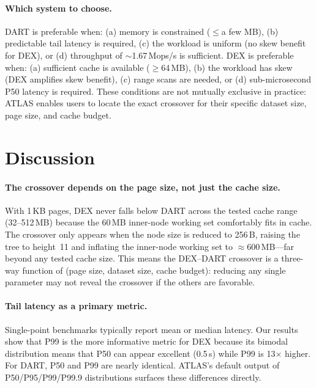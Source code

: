 \documentclass[sigconf, nonacm]{acmart}
\begin{document}
\paragraph{Which system to choose.}
DART is preferable when: (a) memory is constrained (${\le}$a few MB), (b) predictable tail latency is required, (c) the workload is uniform (no skew benefit for DEX), or (d) throughput of ${\sim}$1.67\,Mops/s is sufficient. DEX is preferable when: (a) sufficient cache is available (${\ge}$64\,MB), (b) the workload has skew (DEX amplifies skew benefit), (c) range scans are needed, or (d) sub-microsecond P50 latency is required. These conditions are not mutually exclusive in practice: ATLAS enables users to locate the exact crossover for their specific dataset size, page size, and cache budget.

\section{Discussion}
\label{sec:discussion}

\paragraph{The crossover depends on the page size, not just the cache size.}
With 1\,KB pages, DEX never falls below DART across the tested cache range (32--512\,MB) because the 60\,MB inner-node working set comfortably fits in cache. The crossover only appears when the node size is reduced to 256\,B, raising the tree to height~11 and inflating the inner-node working set to ${\approx}$600\,MB---far beyond any tested cache size. This means the DEX--DART crossover is a three-way function of (page size, dataset size, cache budget): reducing any single parameter may not reveal the crossover if the others are favorable.

\paragraph{Tail latency as a primary metric.}
Single-point benchmarks typically report mean or median latency. Our results show that P99 is the more informative metric for DEX because its bimodal distribution means that P50 can appear excellent (0.5\,\textmu s) while P99 is 13$\times$ higher. For DART, P50 and P99 are nearly identical. ATLAS's default output of P50/P95/P99/P99.9 distributions surfaces these differences directly.
\end{document}
